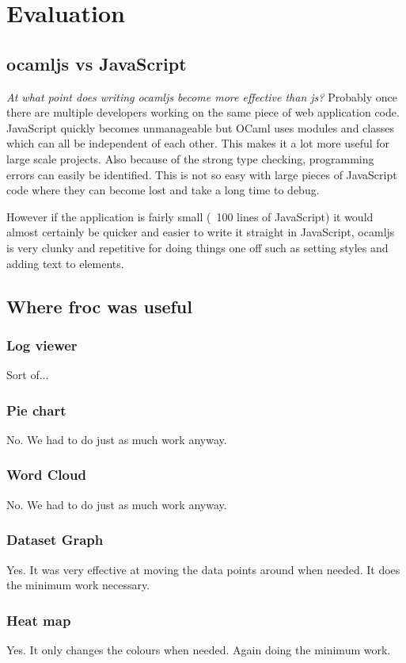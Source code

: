 \chapter{Evaluation}

\section{ocamljs vs JavaScript}
\emph{At what point does writing ocamljs become more effective than js?} Probably once there are multiple developers working on the same piece of web application code. JavaScript quickly becomes unmanageable but OCaml uses modules and classes which can all be independent of each other. This makes it a lot more useful for large scale projects. Also because of the strong type checking, programming errors can easily be identified. This is not so easy with large pieces of JavaScript code where they can become lost and take a long time to debug.

However if the application is fairly small (~100 lines of JavaScript) it would almost certainly be quicker and easier to write it straight in JavaScript, ocamljs is very clunky and repetitive for doing things one off such as setting styles and adding text to elements.

\section{Where froc was useful}
\subsection{Log viewer}
Sort of...
\subsection{Pie chart}
No. We had to do just as much work anyway.
\subsection{Word Cloud}
No. We had to do just as much work anyway.
\subsection{Dataset Graph}
Yes. It was very effective at moving the data points around when needed. It does the minimum work necessary.
\subsection{Heat map}
Yes. It only changes the colours when needed. Again doing the minimum work.
